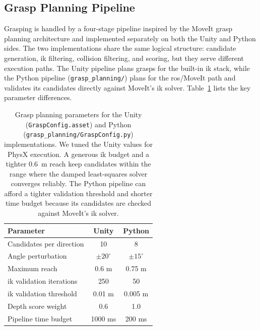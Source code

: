 \documentclass[
     12pt,
     a4paper,
     BCOR=10mm,
     DIV=14,
     listof=totoc,
     bibliography=totoc,
     parskip,
     twoside,
     headsepline
     ]{scrreprt}
\begin{document}
\subsection{Grasp Planning Pipeline}
Grasping is handled by a four-stage pipeline inspired by the MoveIt grasp planning architecture and implemented separately on both the Unity and Python sides. The two implementations share the same logical structure: candidate generation, \gls{ik} filtering, collision filtering, and scoring, but they serve different execution paths. The Unity pipeline plans grasps for the built-in \gls{ik} stack, while the Python pipeline (\texttt{grasp\_planning/}) plans for the \gls{ros}/MoveIt path and validates its candidates directly against MoveIt's \gls{ik} solver. Table~\ref{tab:grasp_params} lists the key parameter differences.

\begin{table}[ht]
	\centering
	\begin{tabular}{lcc}
		\hline
		\textbf{Parameter}             & \textbf{Unity} & \textbf{Python} \\
		\hline
		Candidates per direction       & 10             & 8               \\
		Angle perturbation             & $\pm20^\circ$  & $\pm15^\circ$   \\
		Maximum reach                  & 0.6 m          & 0.75 m          \\
		\gls{ik} validation iterations & 250            & 50              \\
		\gls{ik} validation threshold  & 0.01 m         & 0.005 m         \\
		Depth score weight             & 0.6            & 1.0             \\
		Pipeline time budget           & 1000 ms        & 200 ms          \\
		\hline
	\end{tabular}
	\caption{Grasp planning parameters for the Unity (\texttt{GraspConfig.asset}) and Python (\texttt{grasp\_planning/GraspConfig.py}) implementations. We tuned the Unity values for PhysX execution. A generous \gls{ik} budget and a tighter 0.6~m reach keep candidates within the range where the damped least-squares solver converges reliably. The Python pipeline can afford a tighter validation threshold and shorter time budget because its candidates are checked against MoveIt's \gls{ik} solver.}
	\label{tab:grasp_params}
\end{table}
\end{document}
